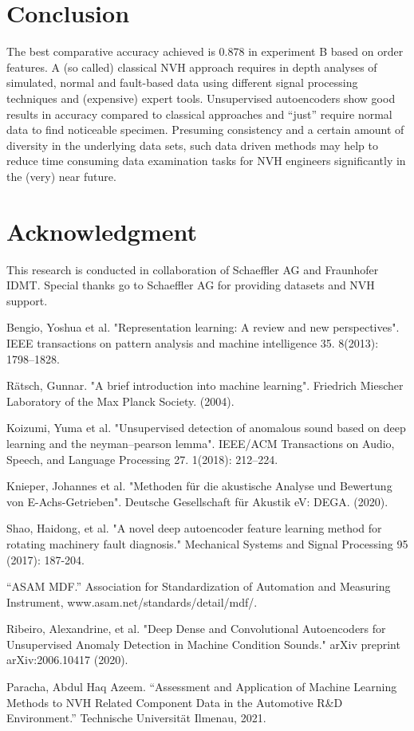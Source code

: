 \documentclass[a4paper, 10pt, twocolumn]{article}
\begin{document}
\section*{Conclusion}
\label{sec:Conclusion}
The best comparative accuracy achieved is 0.878 in experiment B based on order features. A (so called) classical NVH approach requires in depth analyses of simulated, normal and fault-based data using different signal processing techniques and (expensive) expert tools. Unsupervised autoencoders show good results in accuracy compared to classical approaches and \enquote{just} require normal data to ﬁnd noticeable specimen.
Presuming consistency and a certain amount of diversity in the underlying data sets, such data driven methods may help to reduce time consuming data examination tasks for NVH engineers signiﬁcantly in the (very) near future.    



\section*{Acknowledgment}
\label{sec:Acknowledgment}
This research is conducted in collaboration of Schaeffler AG and Fraunhofer IDMT. Special thanks go to Schaeffler AG for providing datasets and NVH support.  



\begin{thebibliography}{8}
Bengio, Yoshua et al. "Representation learning: A review and new perspectives". IEEE transactions on pattern analysis and machine intelligence 35. 8(2013): 1798–1828.

Rätsch, Gunnar. "A brief introduction into machine learning". Friedrich Miescher Laboratory of the Max Planck Society. (2004).

Koizumi, Yuma et al. "Unsupervised detection of anomalous sound based on deep learning and the neyman–pearson lemma". IEEE/ACM Transactions on Audio, Speech, and Language Processing 27. 1(2018): 212–224.


Knieper, Johannes et al. "Methoden für die akustische Analyse und Bewertung von E-Achs-Getrieben". Deutsche Gesellschaft für Akustik eV: DEGA. (2020).




Shao, Haidong, et al. "A novel deep autoencoder feature learning method for rotating machinery fault diagnosis." Mechanical Systems and Signal Processing 95 (2017): 187-204.




“ASAM MDF.” Association for Standardization of Automation and Measuring Instrument, www.asam.net/standards/detail/mdf/. 

Ribeiro, Alexandrine, et al. "Deep Dense and Convolutional Autoencoders for Unsupervised Anomaly Detection in Machine Condition Sounds." arXiv preprint arXiv:2006.10417 (2020).

Paracha, Abdul Haq Azeem. “Assessment and Application of Machine
Learning Methods to NVH Related Component
Data in the Automotive R\&D Environment.” Technische Universität Ilmenau, 2021. 

\end{thebibliography}
\end{document}
